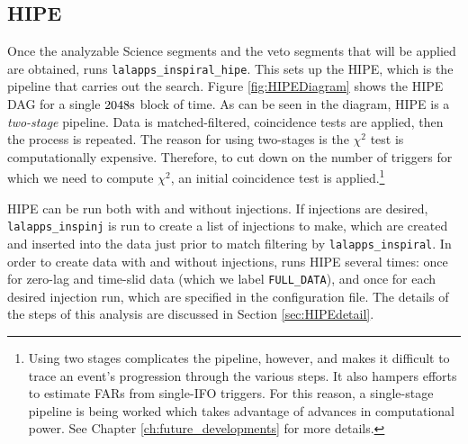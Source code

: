 \subsection{HIPE}
\label{sec:hipe_overview}

Once the analyzable Science segments and the veto segments that will be applied
are obtained, \ihope runs \texttt{lalapps\_inspiral\_hipe}. This sets up the
\ac{HIPE}, which is the pipeline that carries out the search. Figure
\ref{fig:HIPEDiagram} shows the \ac{HIPE} \ac{DAG} for a single $2048\rm{s}$
block of time. As can be seen in the diagram, \ac{HIPE} is a \emph{two-stage} pipeline. Data is matched-filtered, coincidence tests are applied, then the process is repeated. The reason for using two-stages is the $\chi^2$ test is computationally expensive. Therefore, to cut down on the number of triggers for which we need to compute $\chi^2$, an initial coincidence test is applied.\footnote{Using two stages complicates the pipeline, however, and makes it difficult to trace an event's progression through the various steps. It also hampers efforts to estimate \acp{FAR} from single-\ac{IFO} triggers. For this reason, a single-stage pipeline is being worked which takes advantage of advances in computational power. See Chapter \ref{ch:future_developments} for more details.}

\ac{HIPE} can be run both with and without injections. If injections are
desired, \texttt{lalapps\_inspinj} is run to create a list of injections to
make, which are created and inserted into the data just prior to match
filtering by \texttt{lalapps\_inspiral}. In order to create data with and
without injections, \ihope runs \ac{HIPE} several times: once for zero-lag and
time-slid data (which we label \texttt{FULL\_DATA}), and once for each desired
injection run, which are specified in the configuration file. The details of
the steps of this analysis are discussed in Section \ref{sec:HIPEdetail}.

%
%

